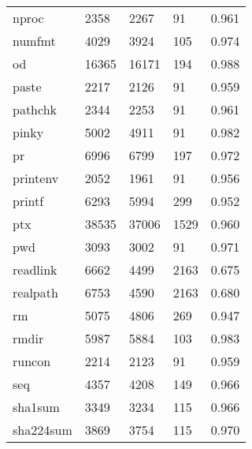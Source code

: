 \begin{longtable}{lp{4.5cm}p{4.5cm}p{4.5cm}p{4.5cm}}
nproc     &                     2358 &         2267 &            91 &                    0.961 \\
numfmt    &                     4029 &         3924 &           105 &                    0.974 \\
od        &                    16365 &        16171 &           194 &                    0.988 \\
paste     &                     2217 &         2126 &            91 &                    0.959 \\
pathchk   &                     2344 &         2253 &            91 &                    0.961 \\
pinky     &                     5002 &         4911 &            91 &                    0.982 \\
pr        &                     6996 &         6799 &           197 &                    0.972 \\
printenv  &                     2052 &         1961 &            91 &                    0.956 \\
printf    &                     6293 &         5994 &           299 &                    0.952 \\
ptx       &                    38535 &        37006 &          1529 &                    0.960 \\
pwd       &                     3093 &         3002 &            91 &                    0.971 \\
readlink  &                     6662 &         4499 &          2163 &                    0.675 \\
realpath  &                     6753 &         4590 &          2163 &                    0.680 \\
rm        &                     5075 &         4806 &           269 &                    0.947 \\
rmdir     &                     5987 &         5884 &           103 &                    0.983 \\
runcon    &                     2214 &         2123 &            91 &                    0.959 \\
seq       &                     4357 &         4208 &           149 &                    0.966 \\
sha1sum   &                     3349 &         3234 &           115 &                    0.966 \\
sha224sum &                     3869 &         3754 &           115 &                    0.970 \\

\end{longtable}
